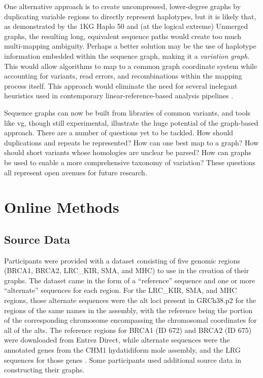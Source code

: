One alternative approach is to create uncompressed, lower-degree graphs
by duplicating variable regions to directly represent haplotypes, but it
is likely that, as demonstrated by the 1KG Haplo 50 and (at the logical
extreme) Unmerged graphs, the resulting long, equivalent sequence paths
would create too much multi-mapping ambiguity. Perhaps a better solution
may be the use of haplotype information embedded within the sequence
graph\cite{novak2016graph}, making it a \emph{variation graph}. This would
allow algorithms to map to a common graph coordinate system while
accounting for variants, read errors, and recombinations within the
mapping process itself. This approach would eliminate the need for
several inelegant heuristics used in contemporary linear-reference-based
analysis pipelines
\cite{1000_Genomes_Project_Consortium2012-gr,McKenna2010-bg}.

Sequence graphs can now be built from libraries of common variants, and
tools like vg, though still experimental, illustrate the huge potential
of the graph-based approach. There are a number of questions yet to be
tackled. How should duplications and repeats be represented? How can one
best map to a graph? How should short variants whose homologies are
unclear be parsed? How can graphs be used to enable a more comprehensive
taxonomy of variation? These questions all represent open avenues for
future research.

\section{Online Methods}

\subsection{Source Data}

Participants were provided with a dataset consisting of five genomic
regions (BRCA1, BRCA2, LRC\_KIR, SMA, and MHC) to use in the creation of
their graphs. The dataset came in the form of a ``reference'' sequence
and one or more ``alternate'' sequences for each region. For the
LRC\_KIR, SMA, and MHC regions, those alternate sequences were the alt
loci present in GRCh38.p2 for the regions of the same names in the
assembly, with the reference being the portion of the corresponding
chromosome encompassing the chromosomal coordinates for all of the alts.
The reference regions for BRCA1 (ID 672) and BRCA2 (ID 675) were
downloaded from Entrez Direct, while alternate sequences were the
annotated genes from the CHM1 hydatidiform mole assembly, and the LRG
sequences for those genes
\cite{Kans2016-ca,MacArthur2014-dh,Chaisson2015-wd}. Some participants
used additional source data in constructing their graphs.

